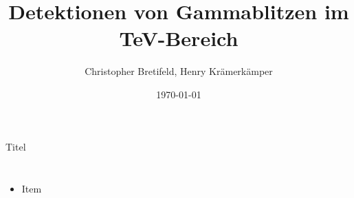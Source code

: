 \documentclass[8pt]{beamer}
\title{Detektionen von Gammablitzen  im TeV-Bereich }
\author{Christopher Bretifeld, Henry Krämerkämper}
\institute{Technische Universität Dortmund}
\date{\today}
\begin{document}
\begin{frame}
  \titlepage
\end{frame}

\begin{frame}{Titel}
  \begin{columns}
      \begin{itemize}
              \item{Item}
      \end{itemize}
  \end{columns}
\end{frame}



\printbibliography

\appendix






\end{document}
